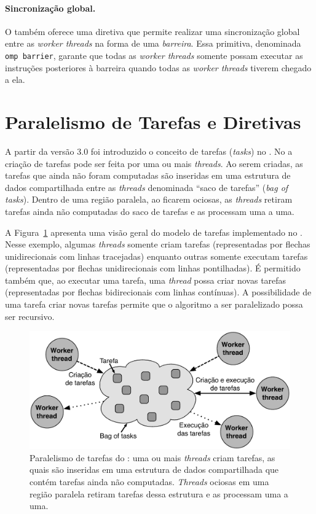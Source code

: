 \documentclass{SBCbookchapter}
\begin{document}
		\paragraph{Sincronização global.} O \openmp também oferece uma diretiva que permite realizar uma
		sincronização global entre as \textit{worker threads} na forma de uma \textit{barreira}. Essa primitiva,
		denominada \texttt{omp barrier}, garante que todas as \textit{worker threads} somente possam executar
		as instruções posteriores à barreira quando todas as \textit{worker threads} tiverem chegado a ela.
	
\section{Paralelismo de Tarefas e Diretivas \openmp}

	A partir da versão 3.0 foi introduzido o conceito de tarefas (\textit{tasks}) no \openmp.
	No \openmp a criação de tarefas pode ser feita por uma ou mais \textit{threads}. Ao
	serem criadas, as tarefas que ainda não foram computadas são inseridas em uma
	estrutura de dados compartilhada entre as \textit{threads} denominada ``saco de tarefas''
	(\textit{bag of tasks}). Dentro de uma região paralela, ao ficarem ociosas, as \textit{threads}
	retiram tarefas ainda não computadas do saco de tarefas e as processam uma a uma.
	
	A Figura~\ref{fig:tasks} apresenta uma visão geral do modelo de tarefas implementado
	no \openmp. Nesse exemplo, algumas \textit{threads} somente criam tarefas (representadas
	por flechas unidirecionais com linhas tracejadas) enquanto outras somente executam tarefas
	(representadas por flechas unidirecionais com linhas pontilhadas). É permitido também que,
	ao executar uma tarefa, uma \textit{thread} possa criar novas tarefas (representadas por
	flechas bidirecionais com linhas contínuas). A possibilidade de uma tarefa criar novas tarefas
	permite que o algoritmo a ser paralelizado possa ser recursivo.
	
		\begin{figure}[t]
			\centering
			\includegraphics[width=0.6\linewidth]{img/tasks}
			\caption{Paralelismo de tarefas do \openmp: uma ou mais \textit{threads} criam
			tarefas, as quais são inseridas em uma estrutura de dados compartilhada
			que contém tarefas ainda não computadas. \textit{Threads} ociosas em
			uma região paralela retiram tarefas dessa estrutura e as processam uma a
			uma.}
			\label{fig:tasks}
		\end{figure}
\end{document}
